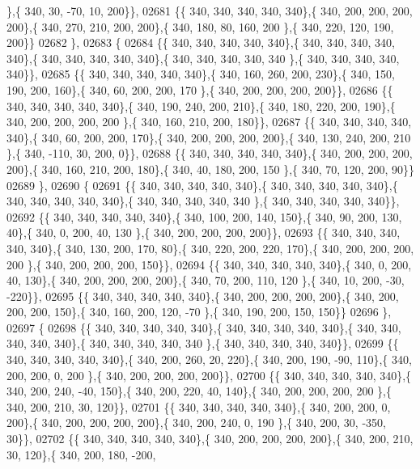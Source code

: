 \begin{DoxyCode}
      \},\{ 340,  30, -70,  10, 200\}\},
02681 \{\{ 340, 340, 340, 340, 340\},\{ 340, 200, 200, 200, 200\},\{ 340, 270, 210, 200, 200\},\{ 340, 180,  80, 160, 200
      \},\{ 340, 220, 120, 190, 200\}\}
02682 \},
02683 \{
02684 \{\{ 340, 340, 340, 340, 340\},\{ 340, 340, 340, 340, 340\},\{ 340, 340, 340, 340, 340\},\{ 340, 340, 340, 340, 340
      \},\{ 340, 340, 340, 340, 340\}\},
02685 \{\{ 340, 340, 340, 340, 340\},\{ 340, 160, 260, 200, 230\},\{ 340, 150, 190, 200, 160\},\{ 340,  60, 200, 200, 170
      \},\{ 340, 200, 200, 200, 200\}\},
02686 \{\{ 340, 340, 340, 340, 340\},\{ 340, 190, 240, 200, 210\},\{ 340, 180, 220, 200, 190\},\{ 340, 200, 200, 200, 200
      \},\{ 340, 160, 210, 200, 180\}\},
02687 \{\{ 340, 340, 340, 340, 340\},\{ 340,  60, 200, 200, 170\},\{ 340, 200, 200, 200, 200\},\{ 340, 130, 240, 200, 210
      \},\{ 340, -110,  30, 200,   0\}\},
02688 \{\{ 340, 340, 340, 340, 340\},\{ 340, 200, 200, 200, 200\},\{ 340, 160, 210, 200, 180\},\{ 340,  40, 180, 200, 150
      \},\{ 340,  70, 120, 200,  90\}\}
02689 \},
02690 \{
02691 \{\{ 340, 340, 340, 340, 340\},\{ 340, 340, 340, 340, 340\},\{ 340, 340, 340, 340, 340\},\{ 340, 340, 340, 340, 340
      \},\{ 340, 340, 340, 340, 340\}\},
02692 \{\{ 340, 340, 340, 340, 340\},\{ 340, 100, 200, 140, 150\},\{ 340,  90, 200, 130,  40\},\{ 340,   0, 200,  40, 130
      \},\{ 340, 200, 200, 200, 200\}\},
02693 \{\{ 340, 340, 340, 340, 340\},\{ 340, 130, 200, 170,  80\},\{ 340, 220, 200, 220, 170\},\{ 340, 200, 200, 200, 200
      \},\{ 340, 200, 200, 200, 150\}\},
02694 \{\{ 340, 340, 340, 340, 340\},\{ 340,   0, 200,  40, 130\},\{ 340, 200, 200, 200, 200\},\{ 340,  70, 200, 110, 120
      \},\{ 340,  10, 200, -30, -220\}\},
02695 \{\{ 340, 340, 340, 340, 340\},\{ 340, 200, 200, 200, 200\},\{ 340, 200, 200, 200, 150\},\{ 340, 160, 200, 120, -70
      \},\{ 340, 190, 200, 150, 150\}\}
02696 \},
02697 \{
02698 \{\{ 340, 340, 340, 340, 340\},\{ 340, 340, 340, 340, 340\},\{ 340, 340, 340, 340, 340\},\{ 340, 340, 340, 340, 340
      \},\{ 340, 340, 340, 340, 340\}\},
02699 \{\{ 340, 340, 340, 340, 340\},\{ 340, 200, 260,  20, 220\},\{ 340, 200, 190, -90, 110\},\{ 340, 200, 200,   0, 200
      \},\{ 340, 200, 200, 200, 200\}\},
02700 \{\{ 340, 340, 340, 340, 340\},\{ 340, 200, 240, -40, 150\},\{ 340, 200, 220,  40, 140\},\{ 340, 200, 200, 200, 200
      \},\{ 340, 200, 210,  30, 120\}\},
02701 \{\{ 340, 340, 340, 340, 340\},\{ 340, 200, 200,   0, 200\},\{ 340, 200, 200, 200, 200\},\{ 340, 200, 240,   0, 190
      \},\{ 340, 200,  30, -350,  30\}\},
02702 \{\{ 340, 340, 340, 340, 340\},\{ 340, 200, 200, 200, 200\},\{ 340, 200, 210,  30, 120\},\{ 340, 200, 180, -200, 

\end{DoxyCode}
